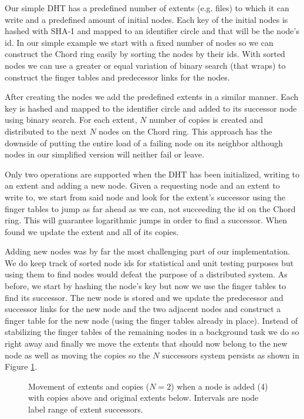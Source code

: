 Our simple DHT has a predefined number of extents (e.g. files) to which it can write and a predefined amount of initial nodes. Each key of the initial nodes is hashed with SHA-1 and mapped to an identifier circle and that will be the node's id. In our simple example we start with a fixed number of nodes so we can construct the Chord ring easily by sorting the nodes by their ids. With sorted nodes we can use a greater or equal variation of binary search (that wraps) to construct the finger tables and predecessor links for the nodes.

After creating the nodes we add the predefined extents in a similar manner. Each key is hashed and mapped to the identifier circle and added to its successor node using binary search. For each extent, $N$ number of copies is created and distributed to the next $N$ nodes on the Chord ring. This approach has the downside of putting the entire load of a failing node on its neighbor although nodes in our simplified version will neither fail or leave.

Only two operations are supported when the DHT has been initialized, writing to an extent and adding a new node. Given a requesting node and an extent to write to, we start from said node and look for the extent's successor using the finger tables to jump as far ahead as we can, not succeeding the id on the Chord ring. This will guarantee logarithmic jumps in order to find a successor. When found we update the extent and all of its copies.

Adding new nodes was by far the most challenging part of our implementation. We do keep track of sorted node ids for statistical and unit testing purposes but using them to find nodes would defeat the purpose of a distributed system. As before, we start by hashing the node's key but now we use the finger tables to find its successor. The new node is stored and we update the predecessor and successor links for the new node and the two adjacent nodes and construct a finger table for the new node (using the finger tables already in place). Instead of stabilizing the finger tables of the remaining nodes in a background task we do so right away and finally we move the extents that should now belong to the new node as well as moving the copies so the $N$ successors system persists as shown in Figure \ref{fig:extentmove}.

\begin{figure}[ht!]
    \centering
    
    \caption{Movement of extents and copies ($N=2$) when a node is added (4) with copies above and original extents below. Intervals are node label range of extent successors.}
    \label{fig:extentmove}
\end{figure}